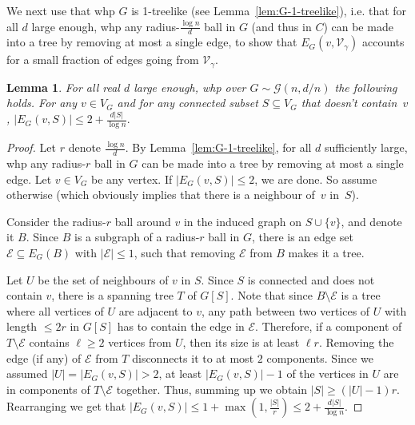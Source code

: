 \documentclass[11pt]{article}
\theoremstyle{plain}
\newtheorem{lemma}[theorem]{Lemma}
\newcommand{\G}{\mathcal{G}}
\newcommand{\Ec}{\mathcal{E}}
\newcommand{\V}{\mathcal{V}}
\newcommand{\Vin}{\V_\gamma}
\newcommand{\1}{\mathbb{1}}
\begin{document}
We next use that whp \(G\) is 1-treelike  (see Lemma~\ref{lem:G-1-treelike}), i.e. that for all \(d\) large enough, whp any radius-\(\tfrac{\log n}{d}\) ball in \(G\) (and thus in \(C\)) can be made into a tree by removing at most a single edge, to show that \(E_G(v,\Vin)\) accounts for a small fraction of edges going from \(\Vin\).
\begin{lemma}\label{lem:not-too-many-edges-into-a-single-vertex-relatively}\label{lem:X}
    For all real $d$ large enough, whp over \(G\sim\G(n,d/n)\) the following holds. For any \(v\in V_G\) and for any connected subset \(S\subseteq V_G\) that doesn't contain~$v$, $
    |E_G(v,S)| \leq 2 + \frac{d|S|}{\log n}.$
\end{lemma}
\begin{proof}
Let $r$ denote $\tfrac{\log n}{d}$.
By Lemma~\ref{lem:G-1-treelike}, for all $d$ sufficiently large, whp any radius-$r$ ball in \(G\) can be made into a tree by removing at most a single edge.     
    Let \(v\in V_G\) be any vertex.
    If \(|E_G(v,S)|\leq 2\), we are done. So assume otherwise (which obviously implies that there is a neighbour of~$v$ in~$S$).  

     Consider the radius-$r$  ball around \(v\) in the induced graph on \(S\cup\{v\}\), and denote it \(B\). Since \(B\) is a subgraph of a radius-$r$ ball in \(G\),  there is an edge set \(\Ec\subseteq E_G(B)\) with \(|\Ec|\leq 1\), such that removing \(\Ec\) from \(B\) makes it a tree.

     Let \(U\) be the set of neighbours of \(v\) in \(S\). Since \(S\) is connected and does not contain \(v\), there is a spanning tree \(T\) of \(G[S]\). Note that since \(B \setminus \Ec\) is a tree where all vertices of \(U\) are adjacent to \(v\), any path between two vertices of \(U\) with length \(\leq 2r \) in \(G[S]\) has to contain the edge in \(\Ec\).     Therefore, if a component of \(T \setminus \Ec\) contains \(\ell\geq 2\) vertices from \(U\), then its size is at least \(\ell r  \).
     Removing the edge (if any) of \(\Ec\) from \(T\) disconnects it to at most \(2\) components. Since we assumed \(|U| = |E_G(v,S)|>2\), at least \(|E_G(v,S)| - 1\) of the vertices in \(U\) are in components of \(T\setminus\Ec\) together. Thus, summing up we obtain $|S| \geq (|U| - 1)  r.$ 
     Rearranging we get that 
     \(|E_G(v,S)|\leq 1 + \max(1, \frac{|S|}{ r} )\leq 2 + \frac{d|S|}{\log n}\).
\end{proof}
\end{document}

